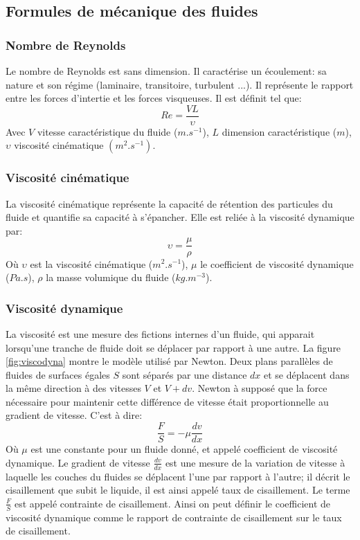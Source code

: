 \documentclass[10pt,a4paper]{article}
\begin{document}
\subsection{Formules de mécanique des fluides}
\subsubsection{Nombre de Reynolds\cite{nbreynolds}}
Le nombre de Reynolds est sans dimension. Il caractérise un écoulement: sa nature et son régime (laminaire, transitoire, turbulent ...). Il représente le rapport entre les forces d'intertie et les forces visqueuses. Il est définit tel que:
\begin{equation}
Re = \frac{VL}{\upsilon}
\end{equation}
Avec $V$ vitesse caractéristique du fluide ($m.s^{-1}$), $L$ dimension caractéristique ($m$), $\upsilon$ viscosité cinématique $(m^{2}.s^{-1})$.

\subsubsection{Viscosité cinématique\cite{viscocinema}}
La viscosité cinématique représente la capacité de rétention des particules du fluide et quantifie sa capacité à s'épancher. Elle est reliée à la viscosité dynamique par:
\begin{equation}
\upsilon = \frac{\mu}{\rho}
\end{equation}
Où $\upsilon$ est la viscosité cinématique ($m^{2}.s^{-1}$), $\mu$ le coefficient de viscosité dynamique ($Pa.s$), $\rho$ la masse volumique du fluide ($kg.m^{-3}$).

\subsubsection{Viscosité dynamique\cite{viscodyna,viscodyna2,viscodyna3}}
La viscosité est une mesure des fictions internes d'un fluide, qui apparait lorsqu'une tranche de fluide doit se déplacer par rapport à une autre. La figure \ref{fig:viscodyna} montre le modèle utilisé par Newton. Deux plans parallèles de fluides de surfaces égales $S$ sont séparés par une distance $dx$ et se déplacent dans la même direction à des vitesses $V$ et $V+dv$. Newton à supposé que la force nécessaire pour maintenir cette différence de vitesse était proportionnelle au gradient de vitesse. C'est à dire:
\begin{equation}
\frac{F}{S} = -\mu \frac{dv}{dx}
\end{equation}
Où $\mu$ est une constante pour un fluide donné, et appelé coefficient de viscosité dynamique. Le gradient de vitesse $\frac{dv}{dx}$ est une mesure de la variation de vitesse à laquelle les couches du fluides se déplacent l'une par rapport à l'autre; il décrit le cisaillement que subit le liquide, il est ainsi appelé taux de cisaillement. Le terme $\frac{F}{S}$ est appelé contrainte de cisaillement. Ainsi on peut définir le coefficient de viscosité dynamique comme le rapport de contrainte de cisaillement sur le taux de cisaillement.
\end{document}
